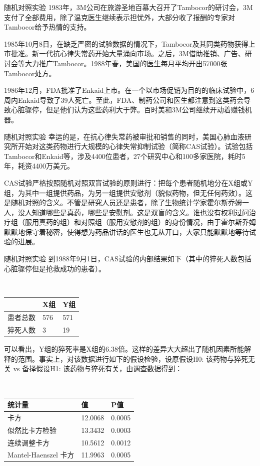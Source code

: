 	\begin{frame}{随机对照实验}
		1983年，3M公司在旅游圣地百慕大召开了Tambocor的研讨会，3M支付了全部费用，除了温克医生继续表示担忧外，大部分收了报酬的专家对Tambocor给予热情的支持。
		
		1985年10月8日，在缺乏严密的试验数据的情况下，Tambocor及其同类药物获得上市批准。新一代抗心律失常药开始大量涌向市场。之后，3M借助推销、广告、研讨会等大力推广Tambocor。1988年春，美国的医生每月平均开出57000张Tambocor处方。
		
		1986年12月，FDA批准了Enkaid上市。在一个以市场促销为目的的临床试验中，6周内Enkaid导致了39人死亡。至此，FDA、制药公司和医生都注意到这类药会导致心脏骤停，但是他们认为这些药利大于弊。百时美和3M公司继续开动着赚钱机器。
	\end{frame}

	\begin{frame}{随机对照实验}
		幸运的是，在抗心律失常药被审批和销售的同时，美国心肺血液研究所开始对这类药物进行大规模的心律失常抑制试验（简称CAS试验）。试验包括Tambocor和Enkaid等，涉及4400位患者，27个研究中心和100多家医院，耗时5年，耗资4400万美元。
		
		CAS试验严格按照\alert{随机对照双盲试验}的原则进行：把每个患者随机地分在X组或Y组，为其中一组提供药品，为另一组提供\alert{安慰剂}（貌似药物，但无任何药效）。这是随机对照的含义。不管是研究人员还是患者，除了生物统计学家霍尔斯乔姆一人，没人知道哪些是真药，哪些是安慰剂。这是双盲的含义。谁也没有权利过问治疗组（服用真药的组）和对照组（服用安慰剂的组）的身份情况，由于霍尔斯乔姆默默地保守着秘密，使得想为药品讲话的医生也无从开口，大家只能默默地等待试验的进展。
	\end{frame}	

	\begin{frame}{随机对照实验}
		到1988年9月1日，CAS试验的内部结果如下（其中的猝死人数包括心脏骤停但是抢救成功的患者）。
		
		$\quad\quad\quad\quad\quad\quad\quad\quad\quad$\begin{tabular}{l|l|l}
			\hline  & X组 & Y组\\
			\hline 患者总数 & 576 & 571\\
			\hline 猝死人数 & 3 & 19 \\
			\hline
		\end{tabular}
		
		可以看出，Y组的猝死率是X组的6.38倍。这样的差异大大超出了随机因素所能解释的范围。事实上，对该数据进行如下的假设检验，设原假设H0: 该药物与猝死无关 vs 备择假设H1: 该药物与猝死有关，由调查数据得到：
		
		$\quad\quad\quad\quad\quad\quad\quad$\begin{tabular}{l|l|l}
			\hline 统计量 & 值 & P值 \\
			\hline 卡方 & 12.0068 & 0.0005\\
			\hline 似然比卡方检验 & 13.3432 & 0.0003 \\
			\hline 连续调整卡方 & 10.5612 & 0.0012 \\
			\hline Mantel-Haenszel 卡方 & 11.9963 & 0.0005 \\
			\hline
		\end{tabular}
	\end{frame}	

